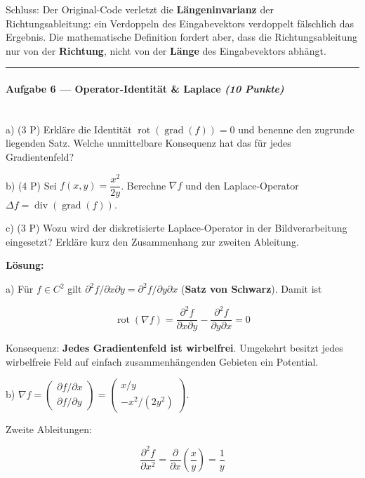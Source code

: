 \documentclass[11pt, a4paper]{article}
\begin{document}
Schluss: Der Original-Code verletzt die \textbf{Längeninvarianz} der Richtungsableitung: ein Verdoppeln des Eingabevektors verdoppelt fälschlich das Ergebnis. Die mathematische Definition fordert aber, dass die Richtungsableitung nur von der \textbf{Richtung}, nicht von der \textbf{Länge} des Eingabevektors abhängt.



\noindent\textcolor{rulegray}{\rule{\linewidth}{0.4pt}}


\paragraph{Aufgabe 6 — Operator-Identität \& Laplace \textit{(10 Punkte)}}\mbox{}\\[2pt]

a) (3 P) Erkläre die Identität $\operatorname{rot}(\operatorname{grad}(f)) = 0$ und benenne den zugrunde liegenden Satz. Welche unmittelbare Konsequenz hat das für jedes Gradientenfeld?


b) (4 P) Sei $f(x,y) = \dfrac{x^2}{2y}$. Berechne $\nabla f$ und den Laplace-Operator $\Delta f = \operatorname{div}(\operatorname{grad}(f))$.


c) (3 P) Wozu wird der diskretisierte Laplace-Operator in der Bildverarbeitung eingesetzt? Erkläre kurz den Zusammenhang zur zweiten Ableitung.


\textbf{Lösung:}


a) Für $f \in C^2$ gilt $\partial^2 f / \partial x \partial y = \partial^2 f / \partial y \partial x$ (\textbf{Satz von Schwarz}). Damit ist

\[
\operatorname{rot}(\nabla f) = \frac{\partial^2 f}{\partial x \partial y} - \frac{\partial^2 f}{\partial y \partial x} = 0
\]

Konsequenz: \textbf{Jedes Gradientenfeld ist wirbelfrei}. Umgekehrt besitzt jedes wirbelfreie Feld auf einfach zusammenhängenden Gebieten ein Potential.


b) $\nabla f = \begin{pmatrix} \partial f / \partial x \\ \partial f / \partial y \end{pmatrix} = \begin{pmatrix} x/y \\ -x^2/(2y^2) \end{pmatrix}$.


Zweite Ableitungen:

\[
\frac{\partial^2 f}{\partial x^2} = \frac{\partial}{\partial x}\left(\frac{x}{y}\right) = \frac{1}{y}
\]
\end{document}
